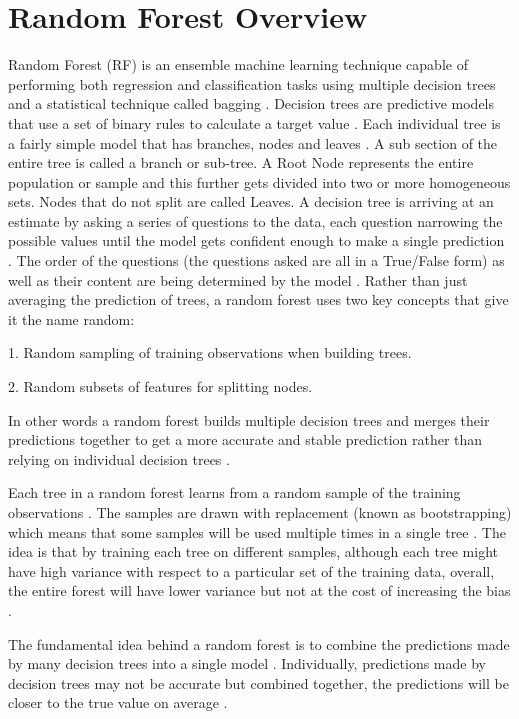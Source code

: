 \documentclass[]{llncs} %
\begin{document}
\section{Random Forest Overview}
Random Forest (RF) is an ensemble machine learning technique capable of performing both regression and classification tasks using multiple decision trees and a statistical technique called bagging \cite{RandomForest}. Decision trees are predictive models that use a set of binary rules to calculate a target value \cite{RandomForest}. Each individual tree is a fairly simple model that has branches, nodes and leaves  \cite{RandomForest}. A sub section of the entire tree is called a branch or sub-tree. A Root Node represents the entire population or sample and this further gets divided into two or more homogeneous sets. Nodes that do not split are called Leaves. A decision tree is arriving at an estimate by asking a series of questions to the data, each question narrowing the possible values until the model gets confident enough to make a single prediction \cite{RandomForest}. The order of the questions (the questions asked are all in a True/False form) as well as their content are being determined by the model \cite{RandomForest}. Rather than just averaging the prediction of trees, a random forest uses two key concepts that give it the name random: \par
1. Random sampling of training observations when building trees.\par
2. Random subsets of features for splitting nodes.\par
In other words a random forest builds multiple decision trees and merges their predictions together to get a more accurate and stable prediction rather than relying on individual decision trees \cite{RandomForest}.\par
Each tree in a random forest learns from a random sample of the training observations \cite{RandomForest}. The samples are drawn with replacement (known as bootstrapping) which means that some samples will be used multiple times in a single tree \cite{RandomForest}. The idea is that by training each tree on different samples, although each tree might have high variance with respect to a particular set of the training data, overall, the entire forest will have lower variance but not at the cost of increasing the bias \cite{RandomForest}. \par
The fundamental idea behind a random forest is to combine the predictions made by many decision trees into a single model \cite{RandomForest}. Individually, predictions made by decision trees may not be accurate but combined together, the predictions will be closer to the true value on average \cite{RandomForest}.\par
\end{document}

